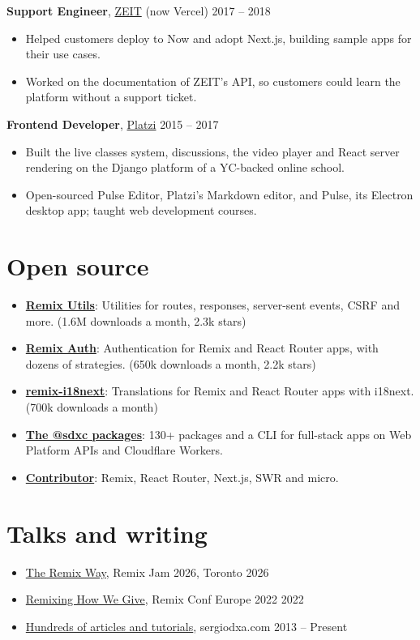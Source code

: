 \documentclass[10pt,letterpaper]{article}
\begin{document}
\textbf{Support Engineer}, \href{https://vercel.com}{ZEIT} {\color{muted}(now Vercel)} \hfill {\color{muted}2017 – 2018}
\begin{itemize}
\item Helped customers deploy to Now and adopt Next.js, building sample apps for their use cases.
\item Worked on the documentation of ZEIT’s API, so customers could learn the platform without a support ticket.
\end{itemize}

\textbf{Frontend Developer}, \href{https://platzi.com}{Platzi} \hfill {\color{muted}2015 – 2017}
\begin{itemize}
\item Built the live classes system, discussions, the video player and React server rendering on the Django platform of a YC-backed online school.
\item Open-sourced Pulse Editor, Platzi’s Markdown editor, and Pulse, its Electron desktop app; taught web development courses.
\end{itemize}

\section*{Open source}
\begin{itemize}
\item \textbf{\href{https://github.com/sergiodxa/remix-utils}{Remix Utils}}: Utilities for routes, responses, server-sent events, CSRF and more. {\color{muted}(1.6M downloads a month, 2.3k stars)}
\item \textbf{\href{https://github.com/sergiodxa/remix-auth}{Remix Auth}}: Authentication for Remix and React Router apps, with dozens of strategies. {\color{muted}(650k downloads a month, 2.2k stars)}
\item \textbf{\href{https://github.com/sergiodxa/remix-i18next}{remix-i18next}}: Translations for Remix and React Router apps with i18next. {\color{muted}(700k downloads a month)}
\item \textbf{\href{https://sdxc.dev}{The @sdxc packages}}: 130+ packages and a CLI for full-stack apps on Web Platform APIs and Cloudflare Workers.
\item \textbf{\href{https://github.com/sergiodxa}{Contributor}}: Remix, React Router, Next.js, SWR and micro.
\end{itemize}

\section*{Talks and writing}
\begin{itemize}
\item \href{https://www.youtube.com/watch?v=o07u1oKE6VA}{The Remix Way}, Remix Jam 2026, Toronto \hfill {\color{muted}2026}
\item \href{https://www.youtube.com/watch?v=eh6FfHFpYMM}{Remixing How We Give}, Remix Conf Europe 2022 \hfill {\color{muted}2022}
\item \href{https://sergiodxa.com}{Hundreds of articles and tutorials}, sergiodxa.com \hfill {\color{muted}2013 – Present}
\end{itemize}
\end{document}
